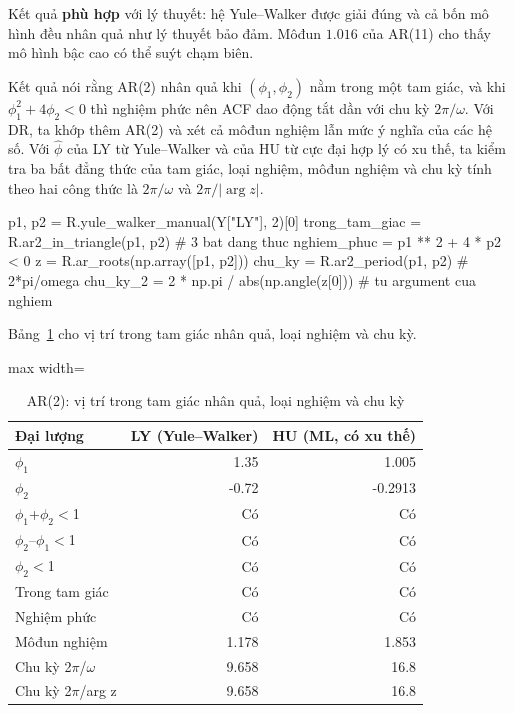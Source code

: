  Kết quả \textbf{phù hợp} với lý thuyết: hệ Yule--Walker được giải đúng và cả bốn mô hình đều nhân quả như lý thuyết bảo đảm. Môđun $1.016$ của AR(11) cho thấy mô hình bậc cao có thể suýt chạm biên.

 Kết quả  nói rằng AR(2) nhân quả khi $(\phi_1,\phi_2)$ nằm trong một tam giác, và khi $\phi_1^2+4\phi_2<0$ thì nghiệm phức nên ACF dao động tắt dần với chu kỳ $2\pi/\omega$.
 Với DR, ta khớp thêm AR(2) và xét cả môđun nghiệm lẫn mức ý nghĩa của các hệ số. Với $\hat\phi$ của LY từ Yule--Walker và của HU từ cực đại hợp lý có xu thế, ta kiểm tra ba bất đẳng thức của tam giác, loại nghiệm, môđun nghiệm và chu kỳ tính theo hai công thức là $2\pi/\omega$ và $2\pi/|\arg z|$.
\begin{codeblock}
p1, p2 = R.yule_walker_manual(Y["LY"], 2)[0]
trong_tam_giac = R.ar2_in_triangle(p1, p2)         # 3 bat dang thuc
nghiem_phuc = p1 ** 2 + 4 * p2 < 0
z = R.ar_roots(np.array([p1, p2]))
chu_ky = R.ar2_period(p1, p2)                      # 2*pi/omega
chu_ky_2 = 2 * np.pi / abs(np.angle(z[0]))         # tu argument cua nghiem
\end{codeblock}
 Bảng~\ref{tab:tab_b11_08_ar2_triangle} cho vị trí trong tam giác nhân quả, loại nghiệm và chu kỳ.
\begin{table}[H]
\centering\footnotesize
\caption{AR(2): vị trí trong tam giác nhân quả, loại nghiệm và chu kỳ}\label{tab:tab_b11_08_ar2_triangle}
\begin{adjustbox}{max width=\linewidth}
\begin{tabular}{|l|r|r|}
\toprule
Đại lượng & LY (Yule–Walker) & HU (ML, có xu thế) \\
\midrule
$\phi_{1}$ & 1.35 & 1.005 \\
$\phi_{2}$ & -0.72 & -0.2913 \\
$\phi_{1}$+$\phi_{2}<$1 & Có & Có \\
$\phi_{2}$–$\phi_{1}<$1 & Có & Có \\
\textbar{}$\phi_{2}$\textbar{}$<$1 & Có & Có \\
Trong tam giác & Có & Có \\
Nghiệm phức & Có & Có \\
Môđun nghiệm & 1.178 & 1.853 \\
Chu kỳ 2$\pi$/$\omega$ & 9.658 & 16.8 \\
Chu kỳ 2$\pi$/\textbar{}arg z\textbar{} & 9.658 & 16.8 \\
\bottomrule
\end{tabular}
\end{adjustbox}
\end{table}
